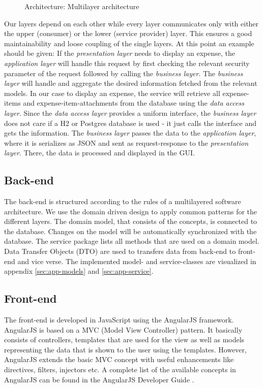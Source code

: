 \begin{figure}[H]
	\centering
	\caption{Architecture: Multilayer architecture}
	\label{fig:architecture-layer}
\end{figure}

Our layers depend on each other while every layer communicates only with either the upper (consumer) or the lower (service provider) layer. This ensures a good maintainability and loose coupling of the single layers.\newline
At this point an example should be given: If the \textit{presentation layer} needs to display an expense, the \textit{application layer} will handle this request by first checking the relevant security parameter of the request followed by calling the \textit{business layer}. The \textit{business layer} will handle and aggregate the desired information fetched from the relevant models. In our case to display an expense, the service will retrieve all expense-items and expense-item-attachments from the database using the \textit{data access layer}. Since the \textit{data access layer} provides a uniform interface, the \textit{business layer} does not care if a H2 or Postgres database is used - it just calls the interface and gets the information. The \textit{business layer} passes the data to the \textit{application layer}, where it is serializes as JSON and sent as request-response to the \textit{presentation layer}. There, the data is processed and displayed in the GUI.

\subsection{Back-end}
The back-end is structured according to the rules of a multilayered software architecture. We use the domain driven design \cite{ddd} to apply common patterns for the different layers. The domain model, that consists of the concepts, is connected to the database. Changes on the model will be automatically synchronized with the database. The service package lists all methods that are used on a domain model.\newline
Data Transfer Objects (DTO) are used to transfers data from back-end to front-end and vice verse. \newline 
The implemented model- and service-classes are visualized in appendix \ref{sec:app-models} and \ref{sec:app-service}.

\subsection{Front-end}
The front-end is developed in JavaScript using the AngularJS framework\cite{angular}. AngularJS is based on a MVC (Model View Controller) pattern. It basically consists of controllers, templates that are used for the view  as well as models representing the data that is shown to the user using the templates. However, AngularJS  extends the basic MVC concept with useful enhancements like directives, filters, injectors etc. A complete list of the available concepts in AngularJS can be found in the AngularJS Developer Guide \cite{angular-devguide}.


